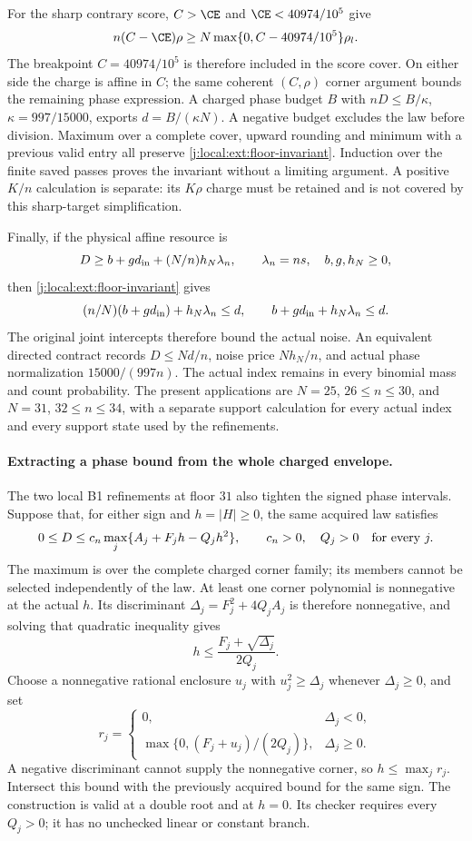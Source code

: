 For the sharp contrary score, $C>\CE$ and $\CE<40974/10^5$ give
\[
 n(C-\CE)\rho
 \ge N\max\{0,C-40974/10^5\}\rho_l.
\]
The breakpoint $C=40974/10^5$ is therefore included in the score
cover. On either side the charge is affine in $C$; the same coherent
$(C,\rho)$ corner argument bounds the remaining phase expression.
A charged phase budget $B$ with $nD\le B/\kappa$,
$\kappa=997/15000$, exports $d=B/(\kappa N)$.
A negative budget excludes the law before division. Maximum over a
complete cover, upward rounding and minimum with a previous valid
entry all preserve \eqref{j:local:ext:floor-invariant}. Induction over the
finite saved passes proves the invariant without a limiting argument.
A positive $K/n$ calculation is separate: its $K\rho$ charge must
be retained and is not covered by this sharp-target simplification.

Finally, if the physical affine resource is
\[
 D\ge b+g d_{\rm in}+(N/n)h_N\lambda_n,
 \qquad \lambda_n=ns,\quad b,g,h_N\ge0,
\]
then \eqref{j:local:ext:floor-invariant} gives
\[
 (n/N)(b+g d_{\rm in})+h_N\lambda_n\le d,
 \qquad b+g d_{\rm in}+h_N\lambda_n\le d.
\]
The original joint intercepts therefore bound the actual noise.
An equivalent directed contract records $D\le Nd/n$, noise price
$Nh_N/n$, and actual phase normalization $15000/(997n)$.
The actual index remains in every binomial mass and count probability.
The present applications are $N=25$, $26\le n\le30$, and $N=31$,
$32\le n\le34$, with a separate support calculation for every
actual index and every support state used by the refinements.

\paragraph{Extracting a phase bound from the whole charged envelope.}
The two local B1 refinements at floor $31$ also tighten the signed
phase intervals. Suppose that, for either sign and $h=|H|\ge0$,
the same acquired law satisfies
\[
 0\le D\le c_n\max_j\{A_j+F_jh-Q_jh^2\},\qquad
 c_n>0,\quad Q_j>0\quad\hbox{for every }j.
\]
The maximum is over the complete charged corner family; its members
cannot be selected independently of the law. At least one corner
polynomial is nonnegative at the actual $h$. Its discriminant
$\Delta_j=F_j^2+4Q_jA_j$ is therefore nonnegative, and solving that
quadratic inequality gives
\[
 h\le\frac{F_j+\sqrt{\Delta_j}}{2Q_j}.
\]
Choose a nonnegative rational enclosure $u_j$ with
$u_j^2\ge\Delta_j$ whenever $\Delta_j\ge0$, and set
\[
 r_j=\begin{cases}
 0,&\Delta_j<0,\\
 \max\{0,(F_j+u_j)/(2Q_j)\},&\Delta_j\ge0.
 \end{cases}
\]
A negative discriminant cannot supply the nonnegative corner, so
$h\le\max_j r_j$. Intersect this bound with the previously acquired
bound for the same sign. The construction is valid at a double root
and at $h=0$. Its checker requires every $Q_j>0$; it has no unchecked
linear or constant branch.

